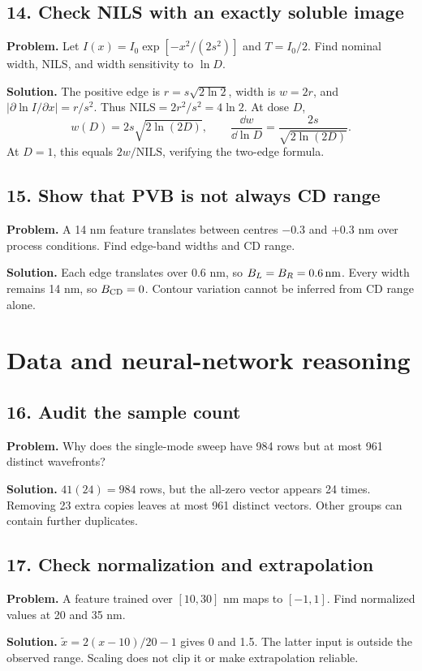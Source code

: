 \subsection*{14. Check NILS with an exactly soluble image}
\textbf{Problem.} Let $I(x)=I_0\exp[-x^2/(2s^2)]$ and $T=I_0/2$.
Find nominal width, NILS, and width sensitivity to $\ln D$.

\textbf{Solution.}
The positive edge is $r=s\sqrt{2\ln2}$, width is $w=2r$, and
$|\partial\ln I/\partial x|=r/s^2$.
Thus $\mathrm{NILS}=2r^2/s^2=4\ln2$.
At dose $D$,
\[
w(D)=2s\sqrt{2\ln(2D)},\qquad
\frac{\dd w}{\dd\ln D}=\frac{2s}{\sqrt{2\ln(2D)}}.
\]
At $D=1$, this equals $2w/\mathrm{NILS}$, verifying the two-edge
formula.

\subsection*{15. Show that PVB is not always CD range}
\textbf{Problem.} A 14 nm feature translates between centres
$-0.3$ and $+0.3$ nm over process conditions. Find edge-band widths
and CD range.

\textbf{Solution.}
Each edge translates over 0.6 nm, so $B_L=B_R=0.6\,\mathrm{nm}$.
Every width remains 14 nm, so $B_{\rm CD}=0$.
Contour variation cannot be inferred from CD range alone.

\section{Data and neural-network reasoning}
\subsection*{16. Audit the sample count}
\textbf{Problem.} Why does the single-mode sweep have 984 rows but at
most 961 distinct wavefronts?

\textbf{Solution.}
$41(24)=984$ rows, but the all-zero vector appears 24 times.
Removing 23 extra copies leaves at most 961 distinct vectors.
Other groups can contain further duplicates.

\subsection*{17. Check normalization and extrapolation}
\textbf{Problem.} A feature trained over $[10,30]$ nm maps to $[-1,1]$.
Find normalized values at 20 and 35 nm.

\textbf{Solution.}
$\tilde x=2(x-10)/20-1$ gives 0 and 1.5.
The latter input is outside the observed range. Scaling does not clip
it or make extrapolation reliable.

